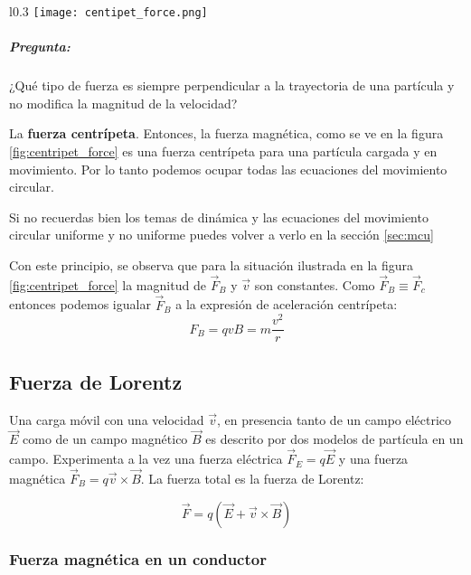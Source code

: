 \begin{wrapfigure}{l}{0.3\textwidth}
  \centering
  \texttt{[image: centipet\_force.png]}
  \caption{Fuerza magnética para una partícula con velocidad \(v\) y un campo magnético entrante.}
  \label{fig:centripet_force}
\end{wrapfigure}
\subparagraph{Pregunta:}

\noindent ¿Qué tipo de fuerza es siempre perpendicular a la trayectoria de una partícula y no modifica la magnitud de la velocidad?

\vspace{3pt}

\noindent La \textbf{fuerza centrípeta}. Entonces, la fuerza magnética, como se ve en la figura \ref{fig:centripet_force} es una fuerza centrípeta para una partícula cargada y en movimiento. Por lo tanto podemos ocupar todas las ecuaciones del movimiento circular.

Si no recuerdas bien los temas de dinámica y las ecuaciones del movimiento circular uniforme y no uniforme puedes volver a verlo en la sección \ref{sec:mcu}

Con este principio, se observa que para la situación ilustrada en la figura \ref{fig:centripet_force} la magnitud de \(\vec{F}_B\) y \(\vec{v}\) son constantes. Como \(\vec{F}_B \equiv \vec{F}_c\) entonces podemos igualar \(\vec{F}_B\) a la expresión de aceleración centrípeta:
\[
  F_B = qvB = m \frac{v^2}{r}
\]
\clearpage
\subsection{Fuerza de Lorentz}

Una carga móvil con una velocidad \(\vec{v}\), en presencia tanto de un campo eléctrico \(\vec{E}\) como de un campo magnético \(\vec{B}\) es descrito por dos modelos de partícula en un campo. Experimenta a la vez una fuerza eléctrica \(\vec{F}_E=q\vec{E}\) y una fuerza magnética \(\vec{F}_B=q\vec{v} \times \vec{B}\). La fuerza total es la fuerza de Lorentz:

\begin{equation}
  \vec{F} = q\left(\vec{E} + \vec{v} \times \vec{B}\right)
  \label{eq:f_lorentz}
\end{equation}

\subsubsection{Fuerza magnética en un conductor}
\label{sec:fuerza_magnetica_en_un_conductor}

